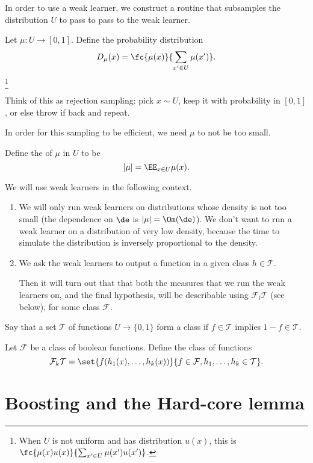 In order to use a weak learner, we construct a routine that subsamples the distribution $U$ to pass to pass to the weak learner.
\begin{df}
Let $\mu:U\to [0,1]$. Define the probability distribution 
$$
D_\mu(x) = \fc{\mu(x)}{\sum_{x'\in U}\mu(x')}.
$$
\footnote{When $U$ is not uniform and has distribution $u(x)$, this is $\fc{\mu(x)u(x)}{\sum_{x'\in U} \mu(x')u(x')}$.}
\end{df}
Think of this as rejection sampling: pick $x\sim U$, keep it with probability in $[0,1]$, or else throw if back and repeat.

In order for this sampling to be efficient, we need $\mu$ to not be too small.
\begin{df}
Define the  of $\mu$ in $U$ to be
$$|\mu| = \EE_{x\in U} \mu(x).$$ 
\end{df}

We will use weak learners in the following context. 
\begin{enumerate}
\item
We will only run weak learners on distributions whose density is not too small (the dependence on $\de$ is $|\mu|=\Om(\de)$). We don't want to run a weak learner on a distribution of very low density, because the time to simulate  the distribution is inversely proportional to the density.
\item
We ask the weak learners to output a function in a given class $h\in \mathcal T$. 

Then it will turn out that that both the measures that we run the weak learners on, and the final hypothesis, will be describable using $\mathcal F_l \mathcal T$ (see below), for some class $\mathcal F$.
\end{enumerate}

\begin{df}
Say that a set $\mathcal T$ of functions $U\to \{0,1\}$ form a class if $f\in \mathcal T$ implies $1-f \in \mathcal T$. 

Let $\mathcal F$ be a class of boolean functions. Define the class of functions
$$
\mathcal F_k \mathcal T = \set{f(h_1(x),\ldots, h_k(x))}{f\in\mathcal F, h_1,\ldots, h_k\in \mathcal T}.
$$
\end{df}


\section{Boosting and the Hard-core lemma}

